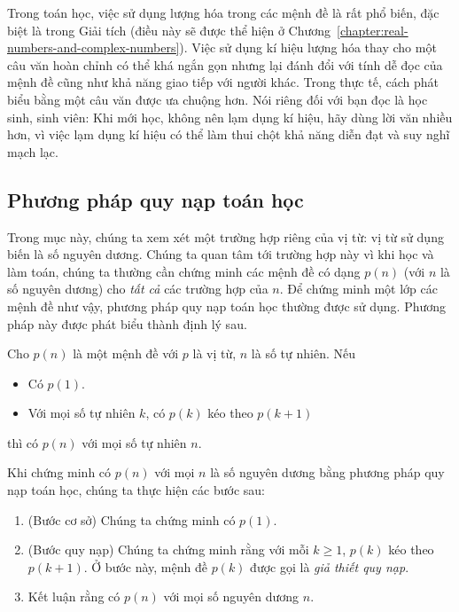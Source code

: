 Trong toán học, việc sử dụng lượng hóa trong các mệnh đề là rất phổ biến, đặc biệt là trong Giải tích (điều này sẽ được thể hiện ở Chương~\ref{chapter:real-numbers-and-complex-numbers}). Việc sử dụng kí hiệu lượng hóa thay cho một câu văn hoàn chỉnh có thể khá ngắn gọn nhưng lại đánh đổi với tính dễ đọc của mệnh đề cũng như khả năng giao tiếp với người khác. Trong thực tế, cách phát biểu bằng một câu văn được ưa chuộng hơn. Nói riêng đối với bạn đọc là học sinh, sinh viên: Khi mới học, không nên lạm dụng kí hiệu, hãy dùng lời văn nhiều hơn, vì việc lạm dụng kí hiệu có thể làm thui chột khả năng diễn đạt và suy nghĩ mạch lạc.

\subsection*{Phương pháp quy nạp toán học}

Trong mục này, chúng ta xem xét một trường hợp riêng của vị từ: vị từ sử dụng biến là số nguyên dương. Chúng ta quan tâm tới trường hợp này vì khi học và làm toán, chúng ta thường cần chứng minh các mệnh đề có dạng $p(n)$ (với $n$ là số nguyên dương) cho \textit{tất cả} các trường hợp của $n$. Để chứng minh một lớp các mệnh đề như vậy, phương pháp quy nạp toán học thường được sử dụng. Phương pháp này được phát biểu thành định lý sau.

\bigskip

\begin{theorem}
    Cho $p(n)$ là một mệnh đề với $p$ là vị từ, $n$ là số tự nhiên. Nếu
    \begin{itemize}
        \item Có $p(1)$.
        \item Với mọi số tự nhiên $k$, có $p(k)$ kéo theo $p(k + 1)$
    \end{itemize}

    thì có $p(n)$ với mọi số tự nhiên $n$.
\end{theorem}

Khi chứng minh có $p(n)$ với mọi $n$ là số nguyên dương bằng phương pháp quy nạp toán học, chúng ta thực hiện các bước sau:

\begin{enumerate}[label={\textbf{Bước \arabic*.}},itemindent=1cm]
    \item (Bước cơ sở) Chúng ta chứng minh có $p(1)$.
    \item (Bước quy nạp) Chúng ta chứng minh rằng với mỗi $k\geq 1$, $p(k)$ kéo theo $p(k+1)$. Ở bước này, mệnh đề $p(k)$ được gọi là \textit{giả thiết quy nạp}.
    \item Kết luận rằng có $p(n)$ với mọi số nguyên dương $n$.
\end{enumerate}

